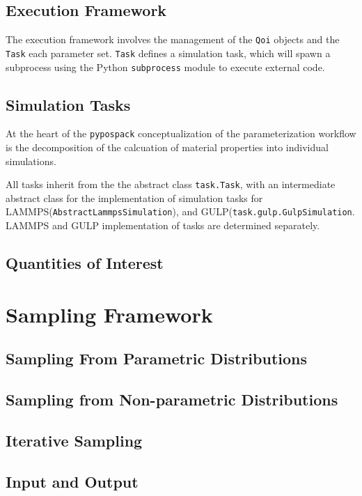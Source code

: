 \subsection{Execution Framework}

The execution framework involves the management of the \verb|Qoi| objects and the \verb|Task| each parameter set.  \verb|Task| defines a simulation task, which will spawn a subprocess using the Python \verb|subprocess| module to execute external code.

\subsection{Simulation Tasks}
At the heart of the \verb|pypospack| conceptualization of the parameterization workflow is the decomposition of the calcuation of material properties into individual simulations.

All tasks inherit from the the abstract class \verb|task.Task|, with an intermediate abstract class for the implementation of simulation tasks for LAMMPS(\verb|AbstractLammpsSimulation|), and GULP(\verb|task.gulp.GulpSimulation|.  LAMMPS and GULP implementation of tasks are determined separately.

\subsection{Quantities of Interest}

\section{Sampling Framework}
\subsection{Sampling From Parametric Distributions}
\subsection{Sampling from Non-parametric Distributions}
\subsection{Iterative Sampling}

\subsection{Input and Output}

